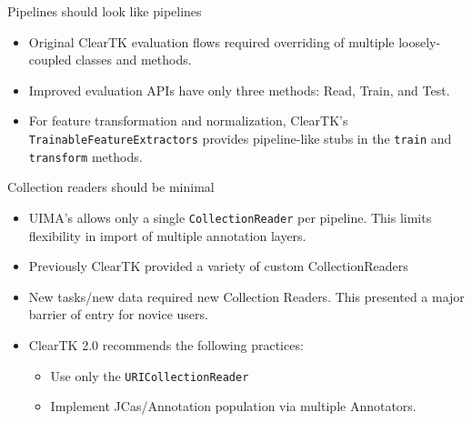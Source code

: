 \documentclass[final]{beamer}
\newcommand{\code}[1]{\texttt{\small #1}}
\begin{document}
\begin{frame}{}
\begin{columns}[t]
\begin{column}{.45\linewidth}
\begin{block}{Pipelines should look like pipelines}
\begin{itemize}
          \begin{itemize}
          \item Original ClearTK evaluation flows required overriding of multiple loosely-coupled classes and methods.
          \item Improved evaluation APIs have only three methods: Read, Train, and Test.
          \item For feature transformation and normalization, ClearTK's \code{TrainableFeatureExtractors} provides pipeline-like stubs in the \code{train} and \code{transform} methods.
          \end{itemize}
      \end{itemize}
    \end{block}
    
    \begin{block}{Collection readers should be minimal}
      \begin{itemize}
              \item UIMA's allows only a single \code{CollectionReader} per pipeline.  This limits flexibility in import of multiple annotation layers.
              \item Previously ClearTK provided a variety of custom CollectionReaders
              \item New tasks/new data required new Collection Readers. This presented a major barrier of entry for novice users.
              \item ClearTK 2.0 recommends the following practices:
                      \begin{itemize}
                      \item Use only the \code{URICollectionReader}
                      \item Implement JCas/Annotation population via multiple Annotators.
                      \end{itemize}
      \end{itemize}
      


    \end{block}
  \end{column}



\end{columns}
\end{frame}
\end{document}
